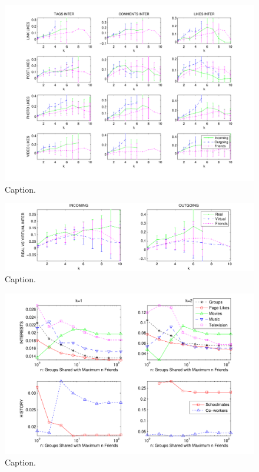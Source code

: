\begin{figure}[t!]
\centering
\includegraphics[scale=0.70]{data/linktype_vs_inter_fix}
\caption{Caption.}
\label{fig:res3}
\end{figure}


\begin{figure}[t!]
\centering
\includegraphics[scale=0.75]{data/real_vs_virtual_fix}
\caption{Caption.}
\label{fig:res4}
\end{figure}

\begin{figure}[t!]
\centering
\includegraphics[scale=0.80]{data/interests_fix}
\caption{Caption.}
\label{fig:res5}
\end{figure}

